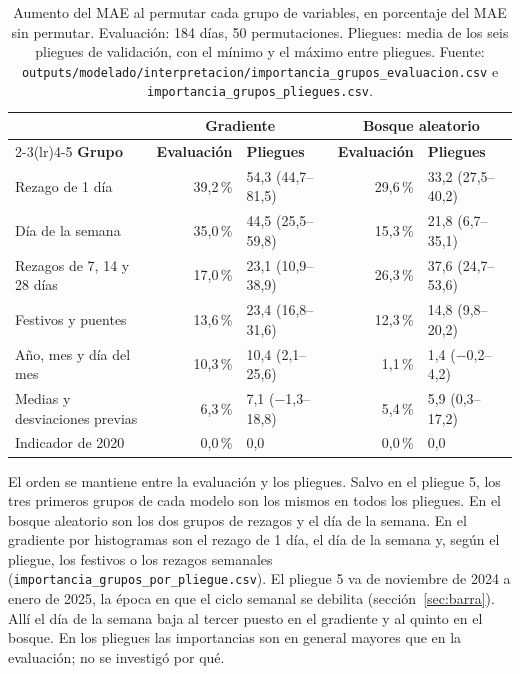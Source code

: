 \begin{table}[H]
\centering
\caption{Aumento del MAE al permutar cada grupo de variables, en porcentaje del MAE sin permutar. Evaluación: 184 días, 50 permutaciones. Pliegues: media de los seis pliegues de validación, con el mínimo y el máximo entre pliegues. Fuente: \texttt{outputs/\allowbreak{}modelado/\allowbreak{}interpretacion/\allowbreak{}importancia\_\allowbreak{}grupos\_\allowbreak{}evaluacion.csv} e \texttt{importancia\_\allowbreak{}grupos\_\allowbreak{}pliegues.csv}.}\label{tab:importancia}
\small
\setlength{\tabcolsep}{4pt}
\begin{tabular}{@{}lrlrl@{}}
\toprule
& \multicolumn{2}{c}{\textbf{Gradiente}} & \multicolumn{2}{c}{\textbf{Bosque aleatorio}} \\
\cmidrule(lr){2-3}\cmidrule(lr){4-5}
\textbf{Grupo} & \textbf{Evaluación} & \textbf{Pliegues} & \textbf{Evaluación} & \textbf{Pliegues} \\
\midrule
Rezago de 1 día & 39,2\,\% & 54,3 (44,7--81,5) & 29,6\,\% & 33,2 (27,5--40,2) \\
Día de la semana & 35,0\,\% & 44,5 (25,5--59,8) & 15,3\,\% & 21,8 (6,7--35,1) \\
Rezagos de 7, 14 y 28 días & 17,0\,\% & 23,1 (10,9--38,9) & 26,3\,\% & 37,6 (24,7--53,6) \\
Festivos y puentes & 13,6\,\% & 23,4 (16,8--31,6) & 12,3\,\% & 14,8 (9,8--20,2) \\
Año, mes y día del mes & 10,3\,\% & 10,4 (2,1--25,6) & 1,1\,\% & 1,4 ($-$0,2--4,2) \\
Medias y desviaciones previas & 6,3\,\% & 7,1 ($-$1,3--18,8) & 5,4\,\% & 5,9 (0,3--17,2) \\
Indicador de 2020 & 0,0\,\% & 0,0 & 0,0\,\% & 0,0 \\
\bottomrule
\end{tabular}
\end{table}

El orden se mantiene entre la evaluación y los pliegues. Salvo en el pliegue 5, los tres primeros grupos de cada modelo son los mismos en todos los pliegues. En el bosque aleatorio son los dos grupos de rezagos y el día de la semana. En el gradiente por histogramas son el rezago de 1 día, el día de la semana y, según el pliegue, los festivos o los rezagos semanales (\texttt{importancia\_\allowbreak{}grupos\_\allowbreak{}por\_\allowbreak{}pliegue.csv}). El pliegue 5 va de noviembre de 2024 a enero de 2025, la época en que el ciclo semanal se debilita (sección~\ref{sec:barra}). Allí el día de la semana baja al tercer puesto en el gradiente y al quinto en el bosque. En los pliegues las importancias son en general mayores que en la evaluación; no se investigó por qué.

